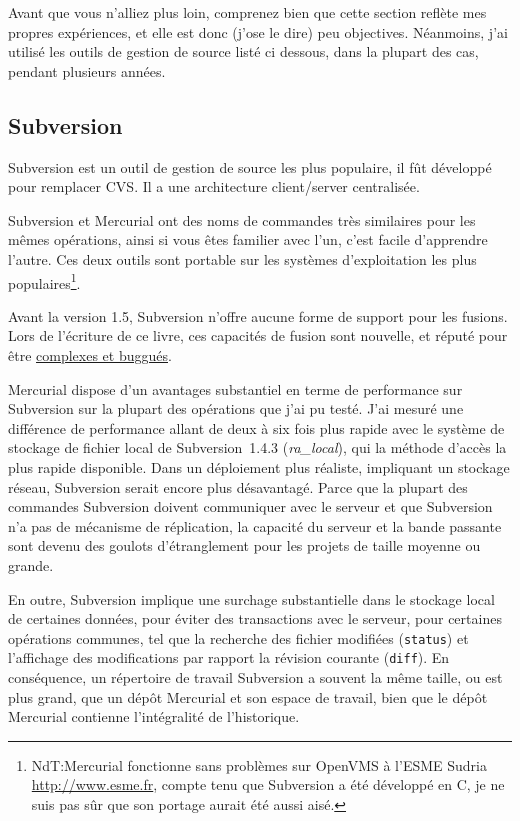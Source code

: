 Avant que vous n'alliez plus loin, comprenez bien que cette section
reflète mes propres expériences, et elle est donc (j'ose le dire)
peu objectives. Néanmoins, j'ai utilisé les outils de gestion de source
listé ci dessous, dans la plupart des cas, pendant plusieurs années.

\subsection{Subversion}

Subversion est un outil de gestion de source les plus populaire, il fût 
développé pour remplacer CVS. Il a une architecture client/server centralisée.

Subversion et Mercurial ont des noms de commandes très similaires pour 
les mêmes opérations, ainsi si vous êtes familier avec l'un, c'est facile
d'apprendre l'autre. Ces deux outils sont portable sur les systèmes 
d'exploitation les plus populaires\footnote{NdT:Mercurial fonctionne sans problèmes
sur OpenVMS à l'ESME Sudria \url{http://www.esme.fr}, compte tenu que Subversion a été 
développé en C, je ne suis pas sûr que son portage aurait été aussi aisé.}.

Avant la version 1.5, Subversion n'offre aucune forme de support pour les fusions. Lors 
de l'écriture de ce livre, ces capacités de fusion sont nouvelle, et réputé pour être
\href{http://svnbook.red-bean.com/nightly/en/svn.branchmerge.advanced.html#svn.branchmerge.advanced.finalword}{complexes
et buggués}.

Mercurial dispose d'un avantages substantiel en terme de performance sur 
Subversion sur la plupart des opérations que j'ai pu testé. J'ai mesuré
une différence de performance allant de deux à six fois plus rapide avec
le système de stockage de fichier local de Subversion~1.4.3 
(\emph{ra\_local}), qui la méthode d'accès la plus rapide disponible. Dans
un déploiement plus réaliste, impliquant un stockage réseau, Subversion 
serait encore plus désavantagé. Parce que la plupart des commandes Subversion
doivent communiquer avec le serveur et que Subversion n'a pas de mécanisme
de réplication, la capacité du serveur et la bande passante sont devenu des
goulots d'étranglement pour les projets de taille moyenne ou grande.

En outre, Subversion implique une surchage substantielle dans le stockage local
de certaines données, pour éviter des transactions avec le serveur, pour 
certaines opérations communes, tel que la recherche des fichier modifiées
(\texttt{status}) et l'affichage des modifications par rapport la révision 
courante (\texttt{diff}). En conséquence, un répertoire de travail Subversion
a souvent la même taille, ou est plus grand, que un dépôt Mercurial et son
espace de travail, bien que le dépôt Mercurial contienne l'intégralité de
l'historique.

